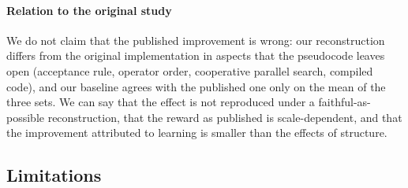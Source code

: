 \paragraph{Relation to the original study}
We do not claim that the published improvement is wrong: our reconstruction differs from the original implementation in aspects that the pseudocode leaves open (acceptance rule, operator order, cooperative parallel search, compiled code), and our baseline agrees with the published one only on the mean of the three sets. We can say that the effect is not reproduced under a faithful-as-possible reconstruction, that the reward as published is scale-dependent, and that the improvement attributed to learning is smaller than the effects of structure.

\subsection{Limitations}
